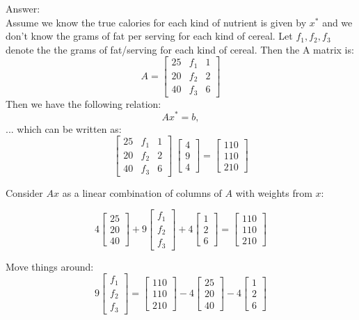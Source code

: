 \documentclass[paper=a4, fontsize=11pt]{scrartcl} %
\numberwithin{equation}{section} %
\numberwithin{figure}{section} %
\numberwithin{table}{section} %
\begin{document}
Answer: \\
Assume we know the true calories for each kind of nutrient is given by $x^*$ and we don't know the grams of fat per serving for each kind of cereal. Let $f_1, f_2, f_3$ denote the the grams of fat/serving for each kind of cereal. Then the A matrix is: 
$$
A = 
\begin{bmatrix}
25 & f_1 & 1 \\
20 & f_2 & 2 \\
40 & f_3 & 6
\end{bmatrix}
$$
Then we have the following relation: 
$$
Ax^* = b,
$$ 
... which can be written as: 
$$ 
\begin{bmatrix}
25 & f_1 & 1 \\
20 & f_2 & 2 \\
40 & f_3 & 6
\end{bmatrix}
\:
\begin{bmatrix}
4	\\
9	\\
4
\end{bmatrix}
=
\begin{bmatrix}
110	\\
110	\\
210
\end{bmatrix}
$$

Consider $Ax$ as a linear combination of columns of $A$ with weights from $x$:

$$
4 
\begin{bmatrix}
25 \\
20 \\
40
\end{bmatrix}
+ 
9 
\begin{bmatrix}
f_1 \\
f_2 \\
f_3
\end{bmatrix}
+
4 
\begin{bmatrix}
1 \\
2 \\ 
6 
\end{bmatrix}
= 
\begin{bmatrix}
110 \\
110 \\
210 
\end{bmatrix}
$$

Move things around: 
$$
9
\begin{bmatrix}
f_1 \\
f_2 \\
f_3
\end{bmatrix}
=
\begin{bmatrix}
110 \\
110 \\
210 
\end{bmatrix}
- 
4 
\begin{bmatrix}
25 \\
20 \\
40
\end{bmatrix}
-
4 
\begin{bmatrix}
1 \\
2 \\ 
6 
\end{bmatrix}
$$
\end{document}
